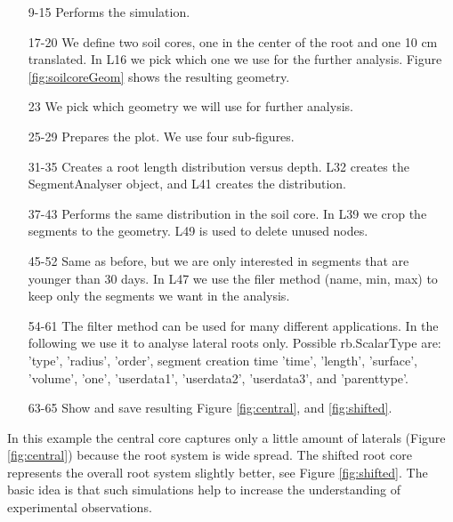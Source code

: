 \documentclass[a4paper]{article}
\begin{document}
\begin{itemize}

\item[9-15] Performs the simulation.

\item[17-20] We define two soil cores, one in the center of the root and one 10 cm translated. In L16 we pick which one we use for the further analysis.  Figure \ref{fig:soilcoreGeom} shows the resulting geometry.

\item[23] We pick which geometry we will use for further analysis.

\item[25-29] Prepares the plot. We use four sub-figures. 

\item[31-35] Creates a root length distribution versus depth. L32 creates the SegmentAnalyser object, and L41 creates the distribution.

\item[37-43] Performs the same distribution in the soil core. In L39 we crop the segments to the geometry. L49 is used to delete unused nodes. 

\item[45-52] Same as before, but we are only interested in segments that are younger than 30 days. In L47 we use the filer method (name, min, max) to keep only the segments we want in the analysis. 

\item[54-61] The filter method can be used for many different applications. In the following we use it to analyse lateral roots only. Possible rb.ScalarType are: 'type', 'radius', 'order', segment creation time 'time', 'length', 'surface', 'volume', 'one', 'userdata1', 'userdata2', 'userdata3', and 'parenttype'.

\item[63-65] Show and save resulting Figure \ref{fig:central}, and \ref{fig:shifted}.

\end{itemize}

In this example the central core captures only a little amount of laterals (Figure \ref{fig:central}) because the root system is wide spread. 
The shifted root core represents the overall root system slightly better, see Figure \ref{fig:shifted}.  
The basic idea is that such simulations help to increase the understanding of experimental observations.
\end{document}
